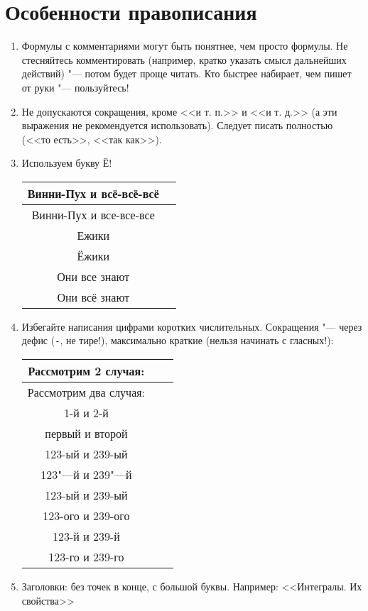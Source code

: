 \section{Особенности правописания}

\begin{enumerate}
\item
	Формулы с комментариями могут быть понятнее, чем просто формулы.
	Не стесняйтесь комментировать (например, кратко указать смысл
	дальнейших действий) "--- потом будет проще читать.
	Кто быстрее набирает, чем пишет от руки "--- пользуйтесь!

\item
	Не допускаются сокращения, кроме <<и т. п.>> и <<и т. д.>> (а эти выражения не рекомендуется использовать).
	Следует писать полностью (<<то есть>>, <<так как>>).
	
\item Используем букву Ё!
	\begin{center}\begin{tabular}{|c|c|}
		\hline Винни-Пух и всё-всё-всё \bad \\
		\hline Винни-Пух и все-все-все \ok \\
		\hline Ежики \bad \\
		\hline Ёжики \ok \\
		\hline Они все знают \ok \\
		\hline Они всё знают \ok \\
		\hline
	\end{tabular}\end{center}

\item
	Избегайте написания цифрами коротких числительных.
	Сокращения "--- через дефис (\verb!-!, не тире!), максимально краткие (нельзя начинать с гласных!):
	\begin{center}\begin{tabular}{|c|c|c|}
		\hline Рассмотрим 2 случая: \bad \\
		\hline Рассмотрим два случая: \ok \\
		\hline 1-й и 2-й \bad \\
		\hline первый и второй \ok\\
		\hline 123-ый и 239-ый \bad \\
		\hline 123"---й и 239"---й \bad \\
		\hline 123-ый и 239-ый \bad \\
		\hline 123-ого и 239-ого \bad \\
		\hline 123-й и 239-й \ok \\
		\hline 123-го и 239-го \ok \\
		\hline
	\end{tabular}\end{center}

\item
	Заголовки: без точек в конце, с большой буквы. Например: <<Интегралы. Их свойства>>
\end{enumerate}

